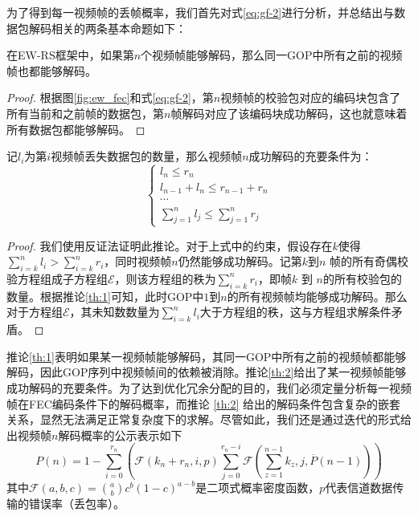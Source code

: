     为了得到每一视频帧的丢帧概率，我们首先对式\ref{eq:gf-2}进行分析，并总结出与数据包解码相关的两条基本命题如下：

    \begin{corollary}\label{th:1}
    在EW-RS框架中，如果第$n$个视频帧能够解码，那么同一GOP中所有之前的视频帧也都能够解码。
    \end{corollary}

    \begin{proof}
    根据图\ref{fig:ew_fec}和式\ref{eq:gf-2}，第$n$视频帧的校验包对应的编码块包含了所有当前和之前帧的数据包，第$n$帧解码对应了该编码块成功解码，这也就意味着所有数据包都能够解码。
    \end{proof}

    \begin{corollary}\label{th:2}
    记$l_i$为第$i$视频帧丢失数据包的数量，那么视频帧$n$成功解码的充要条件为：
     \begin{equation*}
      \left\{ \begin{array}{ll}
        l_n \le r_n\\
        l_{n-1} + l_n \le r_{n-1} + r_n\\
        \cdots\\
        \sum_{j=1}^{n}l_j \le \sum_{j=1}^{n}r_j
      \end{array} \right.
    \end{equation*}
    \end{corollary}

    \begin{proof}
    我们使用反证法证明此推论。对于上式中的约束，假设存在$k$使得$\sum_{i=k}^{n}l_i > \sum_{i=k}^{n}r_i$，同时视频帧$n$仍然能够成功解码。记第$k$到$n$ 帧的所有奇偶校验方程组成子方程组$\mathcal{E}$，则该方程组的秩为$\sum_{i=k}^{n}r_i$，即帧$k$ 到 $n$的所有校验包的数量。根据推论\ref{th:1}可知，此时GOP中$1$到$n$的所有视频帧均能够成功解码。那么对于方程组$\mathcal{E}$，其未知数数量为$\sum_{i=k}^{n}l_i$大于方程组的秩，这与方程组求解条件矛盾。
    \end{proof}

    推论\ref{th:1}表明如果某一视频帧能够解码，其同一GOP中所有之前的视频帧都能够解码，因此GOP序列中视频帧间的依赖被消除。推论\ref{th:2}给出了某一视频帧能够成功解码的充要条件。为了达到优化冗余分配的目的，我们必须定量分析每一视频帧在FEC编码条件下的解码概率，而推论 \ref{th:2} 给出的解码条件包含复杂的嵌套关系，显然无法满足正常复杂度下的求解。尽管如此，我们还是通过迭代的形式给出视频帧$n$解码概率的公示表示如下
    \begin{equation}\label{eq:ep_nth}
        P(n) = 1 - \sum_{i=0}^{ r_{n} } (\mathcal{F}(k_{n}+r_{n}, i, p) \sum_{j=0}^{ r_{n} - i } \mathcal{F}(\sum_{z=1}^{n-1}k_z, j, \overline{P}(n-1)))
    \end{equation}
    其中$\mathcal{F}(a, b, c)={a \choose b} c^{b} (1-c)^{a-b}$是二项式概率密度函数，$p$代表信道数据传输的错误率（丢包率）。

